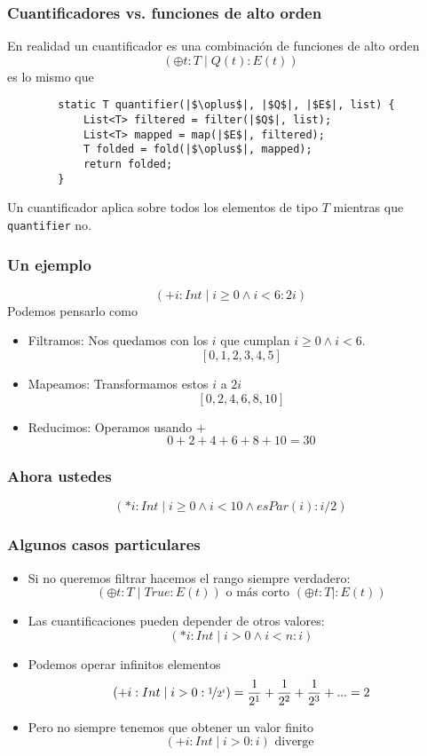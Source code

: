 \documentclass{beamer}
\begin{document}
\begin{frame}[fragile]
    \frametitle{Cuantificadores vs. funciones de alto orden}
    En realidad un cuantificador es una combinación de funciones de alto orden
        $$(\oplus t:T \mid Q(t):E(t))$$
    es lo mismo que
    \begin{verbatim}
        static T quantifier(|$\oplus$|, |$Q$|, |$E$|, list) {
            List<T> filtered = filter(|$Q$|, list);
            List<T> mapped = map(|$E$|, filtered);
            T folded = fold(|$\oplus$|, mapped);
            return folded;
        } 
    \end{verbatim}
    Un cuantificador aplica sobre todos los elementos de tipo $T$  mientras que \verb|quantifier| no.
\end{frame}

\begin{frame}[fragile]
    \frametitle{Un ejemplo}
    $$(+ i:Int \mid i \geq 0 \land i < 6: 2i)$$
    Podemos pensarlo como
    \begin{itemize}
        \item Filtramos: Nos quedamos con los $i$ que cumplan $i \geq 0 \land i < 6$.
            $$[0, 1, 2, 3, 4, 5]$$
        \item Mapeamos: Transformamos estos $i$ a $2i$
            $$[0, 2, 4, 6, 8, 10]$$
        \item Reducimos: Operamos usando $+$
            $$0 + 2 + 4 + 6 + 8 + 10 = 30$$
    \end{itemize}
\end{frame}

\begin{frame}[fragile]
    \frametitle{Ahora ustedes}
    $$(* i:Int \mid i \geq 0 \land i < 10 \land esPar(i): i/2)$$
    \vspace*{165 pt}
\end{frame}

\begin{frame}[fragile]
    \frametitle{Algunos casos particulares}
    \begin{itemize}
    \item Si no queremos filtrar hacemos el rango siempre verdadero:
        $$(\oplus t:T \mid True:E(t))\text{ o más corto }(\oplus t:T \mid:E(t))$$
    \item Las cuantificaciones pueden depender de otros valores:
        $$(* i:Int \mid i>0 \land i < n :i)$$
    \item Podemos operar infinitos elementos
        $$(+ i:Int \mid i > 0:\nicefrac{1}{2^{i}}) = \frac{1}{2^{1}} + \frac{1}{2^{2}} + \frac{1}{2^{3}} + ... = 2$$
    \item Pero no siempre tenemos que obtener un valor finito
        $$(+ i:Int \mid i > 0: i) \text{ diverge }$$
    \end{itemize}
\end{frame}
\end{document}
